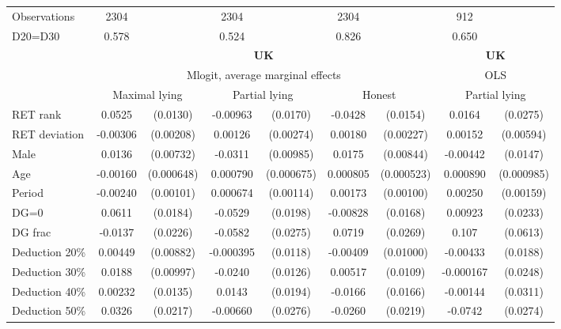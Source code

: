 \begin{tabular}{l|cccccc|cc}
\hline
Observations    &     2304         &         &     2304         &         &     2304         &         &      912         &         \\
D20=D30         &    0.578         &         &    0.524         &         &    0.826         &         &    0.650         &         \\
\hline\hline
&\multicolumn{6}{c|}{\bf UK}&\multicolumn{2}{c}{\bf UK}\\ &\multicolumn{6}{c|}{Mlogit, average marginal effects }&\multicolumn{2}{c}{OLS}\\
                &\multicolumn{2}{c}{Maximal lying}&\multicolumn{2}{c}{Partial lying}&\multicolumn{2}{c|}{Honest}  &\multicolumn{2}{c}{Partial lying}\\
\hline
RET rank        &   0.0525\sym{***}& (0.0130)& -0.00963         & (0.0170)&  -0.0428\sym{***}& (0.0154)&   0.0164         & (0.0275)\\
RET deviation   & -0.00306         &(0.00208)&  0.00126         &(0.00274)&  0.00180         &(0.00227)&  0.00152         &(0.00594)\\
Male            &   0.0136\sym{*}  &(0.00732)&  -0.0311\sym{***}&(0.00985)&   0.0175\sym{**} &(0.00844)& -0.00442         & (0.0147)\\
Age             & -0.00160\sym{**} &(0.000648)& 0.000790         &(0.000675)& 0.000805         &(0.000523)& 0.000890         &(0.000985)\\
Period          & -0.00240\sym{**} &(0.00101)& 0.000674         &(0.00114)&  0.00173\sym{*}  &(0.00100)&  0.00250         &(0.00159)\\
DG=0          &   0.0611\sym{***}& (0.0184)&  -0.0529\sym{***}& (0.0198)& -0.00828         & (0.0168)&  0.00923         & (0.0233)\\
DG frac         &  -0.0137         & (0.0226)&  -0.0582\sym{**} & (0.0275)&   0.0719\sym{***}& (0.0269)&    0.107\sym{*}  & (0.0613)\\
Deduction 20\%&  0.00449         &(0.00882)&-0.000395         & (0.0118)& -0.00409         &(0.01000)& -0.00433         & (0.0188)\\
Deduction 30\%&   0.0188\sym{*}  &(0.00997)&  -0.0240\sym{*}  & (0.0126)&  0.00517         & (0.0109)&-0.000167         & (0.0248)\\
Deduction 40\%&  0.00232         & (0.0135)&   0.0143         & (0.0194)&  -0.0166         & (0.0166)& -0.00144         & (0.0311)\\
Deduction 50\%&   0.0326         & (0.0217)& -0.00660         & (0.0276)&  -0.0260         & (0.0219)&  -0.0742\sym{***}& (0.0274)\\

\end{tabular}

